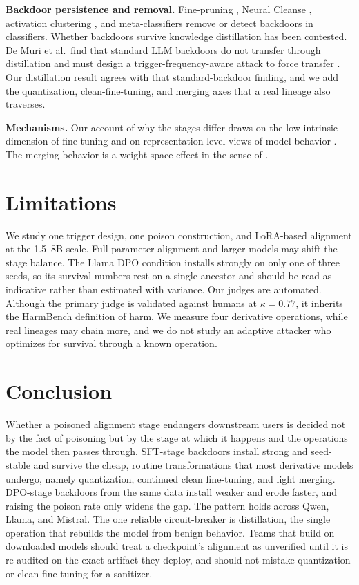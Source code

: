 \documentclass[conference,compsoc]{IEEEtran}
\begin{document}
\textbf{Backdoor persistence and removal.} Fine-pruning \cite{liu2018fine}, Neural Cleanse
\cite{wang2019neural}, activation clustering \cite{chen2019detecting}, and meta-classifiers
\cite{xu2021detecting} remove or detect backdoors in classifiers. Whether backdoors survive
knowledge distillation has been contested. De Muri et al.\ find that standard LLM backdoors
do not transfer through distillation and must design a trigger-frequency-aware attack to
force transfer \cite{chen2024distillation}. Our distillation result agrees with that
standard-backdoor finding, and we add the quantization, clean-fine-tuning, and merging axes
that a real lineage also traverses.

\textbf{Mechanisms.} Our account of why the stages differ draws on the low intrinsic
dimension of fine-tuning \cite{aghajanyan2020intrinsic,hu2022lora} and on
representation-level views of model behavior \cite{zou2023representation,marks2023geometry}.
The merging behavior is a weight-space effect in the sense of
\cite{yadav2023ties,yu2023language,zhao2020bridging}.

\section{Limitations}
We study one trigger design, one poison construction, and LoRA-based alignment at the
1.5--8B scale. Full-parameter alignment and larger models may shift the stage balance. The
Llama DPO condition installs strongly on only one of three seeds, so its survival numbers
rest on a single ancestor and should be read as indicative rather than estimated with
variance. Our judges are automated. Although the primary judge is validated against humans
at $\kappa = 0.77$, it inherits the HarmBench definition of harm. We measure four derivative
operations, while real lineages may chain more, and we do not study an adaptive attacker
who optimizes for survival through a known operation.

\section{Conclusion}
Whether a poisoned alignment stage endangers downstream users is decided not by the fact of
poisoning but by the stage at which it happens and the operations the model then passes
through. SFT-stage backdoors install strong and seed-stable and survive the cheap, routine
transformations that most derivative models undergo, namely quantization, continued clean
fine-tuning, and light merging. DPO-stage backdoors from the same data install weaker and
erode faster, and raising the poison rate only widens the gap. The pattern holds across
Qwen, Llama, and Mistral. The one reliable circuit-breaker is distillation, the single
operation that rebuilds the model from benign behavior. Teams that build on downloaded models
should treat a checkpoint's alignment as unverified until it is re-audited on the exact
artifact they deploy, and should not mistake quantization or clean fine-tuning for a
sanitizer.
\end{document}
